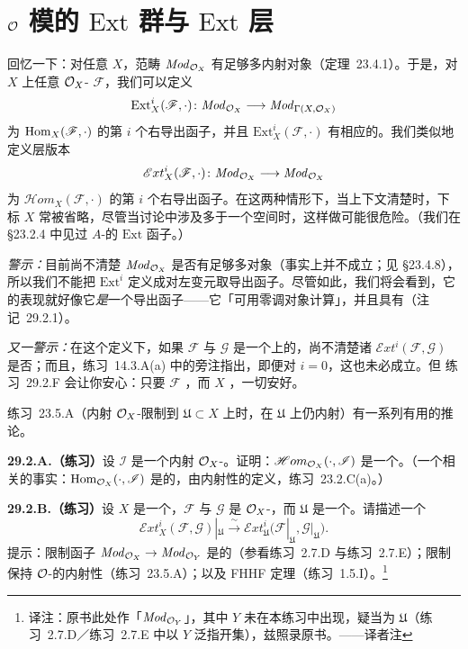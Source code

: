 
\section{$\mathcal{O}$ 模的 $\mathrm{Ext}$ 群与 $\mathrm{Ext}$ 层}

回忆一下：对任意\trRingedSpace{} $X$，范畴 $\mathit{Mod}_{\mathcal{O}_X}$ 有足够多内射对象（\mbox{定理~23.4.1}）。于是，对 $X$ 上任意 $\mathcal{O}_X$-\trModule{} $\mathscr{F}$，我们可以定义
\[
\mathrm{Ext}^i_X(\mathscr{F},\cdot)\colon\mathit{Mod}_{\mathcal{O}_X}\longrightarrow\mathit{Mod}_{\Gamma(X,\mathcal{O}_X)}
\]
为 $\operatorname{Hom}_X(\mathscr{F},\cdot)$ 的第 $i$ 个右导出函子，并且 $\mathrm{Ext}^i_X(\mathscr{F},\cdot)$ 有相应的\trLongExactSequence。我们类似地定义层版本
\[
\mathscr{E}xt^i_X(\mathscr{F},\cdot)\colon\mathit{Mod}_{\mathcal{O}_X}\longrightarrow\mathit{Mod}_{\mathcal{O}_X}
\]
为 $\mathscr{H}om_X(\mathscr{F},\cdot)$ 的第 $i$ 个右导出函子。在这两种情形下，当上下文清楚时，下标 $X$ 常被省略，尽管当讨论中涉及多于一个空间时，这样做可能很危险。（我们在 \S23.2.4 中见过 $A$-\trModule{}的 $\mathrm{Ext}$ 函子。）

\emph{警示：}目前尚不清楚 $\mathit{Mod}_{\mathcal{O}_X}$ 是否有足够多\trProjectiveObj{}对象（事实上并不成立；见 \S23.4.8），所以我们不能把 $\mathrm{Ext}^i$ 定义成对左变元取导出函子。尽管如此，我们将会看到，它的表现就好像它\emph{是}一个导出函子——它「可用零调对象计算」，并且具有\trLongExactSequence（\mbox{注记~29.2.1}）。

\emph{又一警示：}在这个定义下，如果 $\mathscr{F}$ 与 $\mathscr{G}$ 是一个\trScheme{}上的\trQCSheaf，尚不清楚诸 $\mathscr{E}xt^i(\mathscr{F},\mathscr{G})$ 是否\trQC；而且，\mbox{练习~14.3.A(a)} 中的旁注指出，即便对 $i=0$，这也未必成立。但 \mbox{练习~29.2.F} 会让你安心：只要 $\mathscr{F}$ \trCoh{}，而 $X$ \trLocally\trNoetherian，一切安好。

\mbox{练习~23.5.A}（内射 $\mathcal{O}_X$-\trModule{}限制到\trOpenSubset{} $\mathfrak{U}\subset X$ 上时，在 $\mathfrak{U}$ 上仍内射）有一系列有用的推论。

\textbf{29.2.A.（练习）}\quad 设 $\mathscr{I}$ 是一个内射 $\mathcal{O}_X$-\trModule。证明：$\mathscr{H}om_{\mathcal{O}_X}(\cdot,\mathscr{I})$ 是一个\trExact{}\trContravariantFunctor。（一个相关的事实：$\operatorname{Hom}_{\mathcal{O}_X}(\cdot,\mathscr{I})$ 是\trExact{}的，由内射性的定义，\mbox{练习~23.2.C(a)}。）

\textbf{29.2.B.（练习）}\quad 设 $X$ 是一个\trRingedSpace，$\mathscr{F}$ 与 $\mathscr{G}$ 是 $\mathcal{O}_X$-\trModule，而 $\mathfrak{U}$ 是一个\trOpenSubset。请描述一个\trCanonical\trIsomorphism
\[
\mathscr{E}xt^i_X(\mathscr{F},\mathscr{G})|_{\mathfrak{U}}\xrightarrow{\ \sim\ }\mathscr{E}xt^i_{\mathfrak{U}}\bigl(\mathscr{F}|_{\mathfrak{U}},\mathscr{G}|_{\mathfrak{U}}\bigr).
\]
提示：限制函子 $\mathit{Mod}_{\mathcal{O}_X}\to\mathit{Mod}_{\mathcal{O}_Y}$ 是\trExact{}的（参看\mbox{练习~2.7.D} 与\mbox{练习~2.7.E}）；限制保持 $\mathcal{O}$-\trModule{}的内射性（\mbox{练习~23.5.A}）；以及 FHHF 定理（\mbox{练习~1.5.I}）。\footnote{译注：原书此处作「$\mathit{Mod}_{\mathcal{O}_Y}$」，其中 $Y$ 未在本练习中出现，疑当为 $\mathfrak{U}$（\mbox{练习~2.7.D}／\mbox{练习~2.7.E} 中以 $Y$ 泛指开集），兹照录原书。——译者注}

